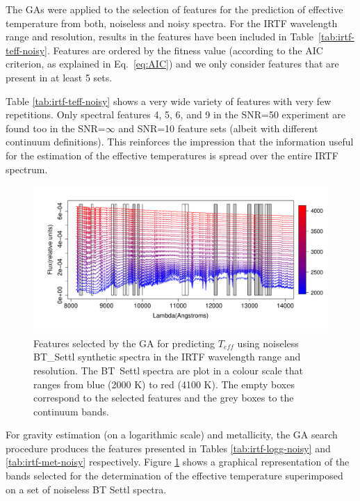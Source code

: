 The GAs were applied to the selection of features for the prediction
of effective temperature from both, noiseless and noisy spectra.  For
the IRTF wavelength range and resolution, results in the features have
been included in Table~\ref{tab:irtf-teff-noisy}. Features are
ordered by the fitness value (according to the AIC criterion, as
explained in Eq.~\ref{eq:AIC}) and we only consider features that are
present in at least 5 sets.

Table
\ref{tab:irtf-teff-noisy}
shows a very wide variety of features with very few repetitions. Only
spectral features 4, 5, 6, and 9 in the SNR=50 experiment are found
too in the SNR=$\infty$ and SNR=10 feature sets (albeit with different
continuum definitions). This reinforces the impression that the
information useful for the estimation of the effective temperatures is
spread over the entire IRTF spectrum.

\begin{figure}
\includegraphics[width=\textwidth]{figs/BT-spectraAtIRTF-Inf-teff2}
 \caption{Features selected by the GA for predicting $T_{eff}$ using
    noiseless BT\_Settl synthetic spectra in the IRTF wavelength range
    and resolution. The BT\ Settl spectra are plot in a colour scale
    that ranges from blue (2000 K) to red (4100 K). The empty boxes
    correspond to the selected features and the grey boxes to the
    continuum bands.}  \label{fig:IRTF-teff}
\end{figure}

For gravity estimation (on a logarithmic scale) and metallicity,
the GA search procedure produces the features presented in Tables
\ref{tab:irtf-logg-noisy} and \ref{tab:irtf-met-noisy}
respectively. Figure \ref{fig:IRTF-teff} shows a graphical
representation of the bands selected for the determination of the
effective temperature superimposed on a set of noiseless BT Settl
spectra.

